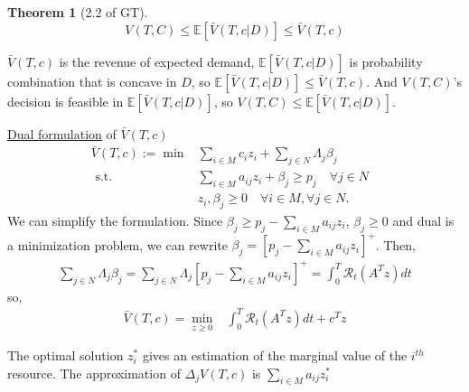 \documentclass[11pt,a4paper]{article}
\newtheorem{theorem}{Theorem}
\begin{document}
\begin{theorem}[2.2 of GT]
$$V(T,C)\leq \mathbb{E}[\bar{V}(T, c|D)]\leq \bar{V}(T, c)$$
\end{theorem}
$\bar{V}(T, c)$ is the revenue of expected demand, $\mathbb{E}[\bar{V}(T, c|D)]$ is probability combination that is concave in $D$, so $\mathbb{E}[\bar{V}(T, c|D)]\leq \bar{V}(T, c)$. And $V(T,C)$'s decision is feasible in $\mathbb{E}[\bar{V}(T, c|D)]$, so $V(T,C)\leq \mathbb{E}[\bar{V}(T, c|D)]$.

\underline{Dual formulation} of $\bar{V}(T, c)$
$$\begin{array}{rlr}
    \bar{V}(T, c):=\min & \sum_{i \in M} c_{i} z_{i}+\sum_{j\in N}\Lambda_j\beta_j & \\
    \text { s.t. } & \sum_{i \in M} a_{i j} z_{i}+\beta_j \geq p_{j} \quad \forall j \in N \\
    & z_i, \beta_j\geq 0 \quad \forall i \in M, \forall j \in N.
\end{array}$$
We can simplify the formulation. Since $\beta_j\geq p_{j}-\sum_{i \in M} a_{i j} z_{i}$, $\beta_j\geq 0$ and dual is a minimization problem, we can rewrite $\beta_j= [p_{j}-\sum_{i \in M} a_{i j} z_{i}]^+$. Then,
\begin{equation}
    \begin{aligned}
        \sum_{j\in N}\Lambda_j\beta_j=\sum_{j\in N}\Lambda_j[p_{j}-\sum_{i \in M} a_{i j} z_{i}]^+=\int_0^T\mathcal{R}_{t}(A^Tz)dt
    \end{aligned}
    \nonumber
\end{equation}
so,
\begin{equation}
    \begin{aligned}
        \bar{V}(T, c)=\min_{z\geq 0} & \int_0^T\mathcal{R}_{t}(A^Tz)dt+c^Tz
    \end{aligned}
    \nonumber
\end{equation}

The optimal solution $z_i^*$ gives an estimation of the marginal value of the $i^{th}$ resource. The approximation of $\Delta_j V(T,c)$ is $\sum_{i\in M}a_{ij}z_i^*$


\begin{center}
\end{center}
\end{document}
